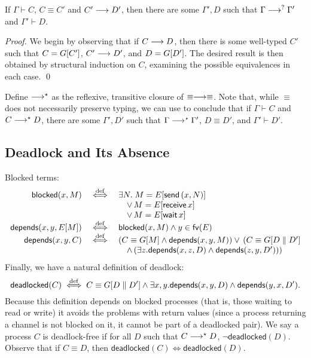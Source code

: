 \documentclass[orivec,envcountsame]{llncs}
\begin{document}
\begin{theorem}\label{thm:preservation-equiv}
  If $\Gamma \vdash C$, $C \equiv C'$ and $C' \longrightarrow D'$, then there are some $\Gamma',D$ such that
  $\Gamma \longrightarrow^? \Gamma'$ and $\Gamma' \vdash D$.
\end{theorem}

\begin{proof}
  We begin by observing that if $C \longrightarrow D$, then there is some well-typed $C'$ such that $C =
  G[C']$, $C' \longrightarrow D'$, and $D = G[D']$.  The desired result is then obtained by structural
  induction on $C$, examining the possible equivalences in each case. \qed
\end{proof}

Define $\longrightarrow^\star$ as the reflexive, transitive closure of $\equiv\longrightarrow\equiv$.  Note that,
while $\equiv$ does not necessarily preserve typing, we can use  to
conclude that if $\Gamma \vdash C$ and $C \longrightarrow^\star D$, there are some $\Gamma',D'$ such that
$\Gamma \longrightarrow^\star \Gamma'$, $D \equiv D'$, and $\Gamma' \vdash D'$.

\subsection{Deadlock and Its Absence}\label{sec:gv-deadlock}

Blocked terms:
\newcommand{\blockedp}{\mathsf{blocked}}
\newcommand{\depp}{\mathsf{depends}}
\[\begin{array}{rcl}
  \blockedp(x,M) &\defiff& \exists N. \; M = \Ex[\gvconst{send} \app (x,N)] \\
  && \quad \lor \, M = \Ex[\gvconst{receive} \app x] \\
  && \quad \lor \, M = \Ex[\gvconst{wait} \app x] \\
  \depp(x,y,\Ex[M]) &\defiff& \blockedp(x,M) \land y \in \fv(\Ex) \\
  \depp(x,y,C) &\defiff& (C \equiv \Cx[M] \land \depp(x,y,M)) \lor \, (C \equiv \Cx[D \parallel D'] \\
  && \quad \land \, (\exists z. \depp(x,z,D) \land \depp(z,y,D')))
\end{array}\]
Finally, we have a natural definition of deadlock:
\newcommand{\deadlockp}{\ensuremath{\mathsf{deadlocked}}}
\[
\deadlockp(C) \defiff C \equiv \Cx[D \parallel D'] \land \exists x,y. \depp(x,y,D) \land \depp(y,x,D').
\]
Because this definition depends on blocked processes (that is, those waiting to read or write) it
avoids the problems with return values (since a process returning a channel is not blocked on it, it
cannot be part of a deadlocked pair).  We say a process $C$ is deadlock-free if for all $D$ such
that $C \longrightarrow^\star D$, $\lnot\deadlockp(D)$.  Observe that if $C \equiv D$, then $\deadlockp(C)
\iff \deadlockp(D)$.
\end{document}

